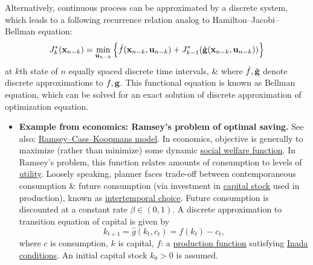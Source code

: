 \documentclass{article}
\begin{document}
\begin{enumerate}
	Alternatively, continuous process can be approximated by a discrete system, which leads to a following recurrence relation analog to Hamilton--Jacobi--Bellman equation:
	\begin{equation*}
		J_k^*({\bf x}_{n-k}) = \min_{{\bf u}_{n-k}} \left\{\hat{f}({\bf x}_{n-k},{\bf u}_{n-k}) + J_{k-1}^*(\hat{\bf g}({\bf x}_{n-k},{\bf u}_{n-k}))\right\}
	\end{equation*}
	at $k$th state of $n$ equally spaced discrete time intervals, \& where $\hat{f},\hat{\bf g}$ denote discrete approximations to $f,{\bf g}$. This functional equation is known as Bellman equation, which can be solved for an exact solution of discrete approximation of optimization equation.
	\begin{itemize}
		\item {\bf Example from economics: Ramsey's problem of optimal saving.} See also: \href{https://en.wikipedia.org/wiki/Ramsey%E2%80%93Cass%E2%80%93Koopmans_model}{Ramsey--Cass--Koopmans model}. In economics, objective is generally to maximize (rather than minimize) some dynamic \href{https://en.wikipedia.org/wiki/Social_welfare_function}{social welfare function}. In Ramsey's problem, this function relates amounts of consumption to levels of \href{https://en.wikipedia.org/wiki/Utility}{utility}. Loosely speaking, planner faces trade-off between contemporaneous consumption \& future consumption (via investment in \href{https://en.wikipedia.org/wiki/Physical_capital}{capital stock} used in production), known as \href{https://en.wikipedia.org/wiki/Intertemporal_choice}{intertemporal choice}. Future consumption is discounted at a constant rate $\beta\in(0,1)$. A discrete approximation to transition equation of capital is given by
		\begin{equation*}
			k_{t+1} = \hat{g}(k_t,c_t) = f(k_t) - c_t,
		\end{equation*}
		where $c$ is consumption, $k$ is capital, $f$: a \href{https://en.wikipedia.org/wiki/Production_function}{production function} satisfying \href{https://en.wikipedia.org/wiki/Inada_conditions}{Inada conditions}. An initial capital stock $k_0 > 0$ is assumed.
		

\end{itemize}
\end{enumerate}
\end{document}

